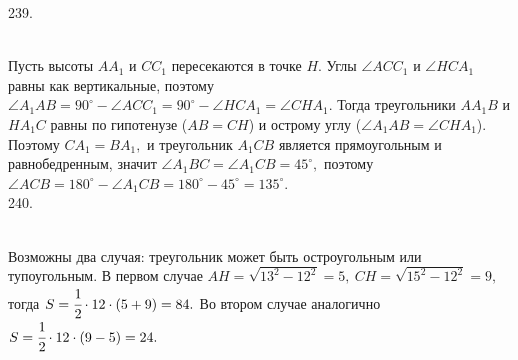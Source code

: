 \documentclass[12pt]{article}
\begin{document}
239. \begin{figure}[ht!]
\end{figure}\\
Пусть высоты $AA_1$ и $CC_1$ пересекаются в точке $H.$ Углы $\angle ACC_1$ и $\angle HCA_1$ равны как вертикальные, поэтому $\angle A_1AB=90^\circ-\angle ACC_1=90^\circ-\angle HCA_1=\angle CHA_1.$ Тогда треугольники $AA_1B$ и $HA_1C$ равны по гипотенузе ($AB=CH$) и острому углу ($\angle A_1AB=\angle CHA_1$). Поэтому $CA_1=BA_1,$ и треугольник $A_1CB$ является прямоугольным и равнобедренным, значит $\angle A_1BC=\angle A_1CB=45^\circ,$ поэтому $\angle ACB=180^\circ-\angle A_1CB=180^\circ-45^\circ=135^\circ.$\\
240. \begin{figure}[ht!]
\end{figure}\\
Возможны два случая: треугольник может быть остроугольным или тупоугольным. В первом случае $AH=\sqrt{13^2-12^2}=5,\ CH=\sqrt{15^2-12^2}=9,$ тогда $S=\cfrac{1}{2}\cdot12\cdot(5+9)=84.$ Во втором случае аналогично $S=\cfrac{1}{2}\cdot12\cdot(9-5)=24.$\newpage\noindent
\end{document}
